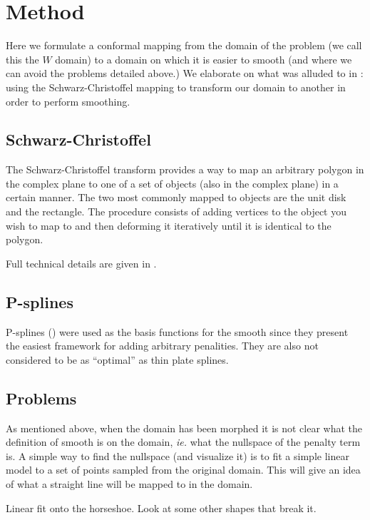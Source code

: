 \documentclass[a4paper,10pt]{amsart}
\newcommand{\sch}{Schwarz-Christoffel }
\begin{document}
\section{Method}

Here we formulate a conformal mapping from the domain of the problem (we call this the $W$ domain) to a domain on which it is easier to smooth (and where we can avoid the problems detailed above.) We elaborate on what was alluded to in \cite{eilerstalk}: using the \sch mapping to transform our domain to another in order to perform smoothing.

\subsection{\sch}

The \sch transform provides a way to map an arbitrary polygon in the complex plane to one of a set of objects (also in the complex plane) in a certain manner. The two most commonly mapped to objects are the unit disk and the rectangle. The procedure consists of adding vertices to the object you wish to map to and then deforming it iteratively until it is identical to the polygon.

Full technical details are given in \cite{miller08}.


\subsection{P-splines}
P-splines (\cite{eilersmarx96}) were used as the basis functions for the smooth since they present the easiest framework for adding arbitrary penalities. They are also not considered to be as ``optimal'' as thin plate splines.


\subsection{Problems}

As mentioned above, when the domain has been morphed it is not clear what the definition of smooth is on the domain, \emph{ie.} what the nullspace of the penalty term is. A simple way to find the nullspace (and visualize it) is to fit a simple linear model to a set of points sampled from the original domain. This will give an idea of what a straight line will be mapped to in the domain.


Linear fit onto the horseshoe.
Look at some other shapes that break it.
\end{document}
